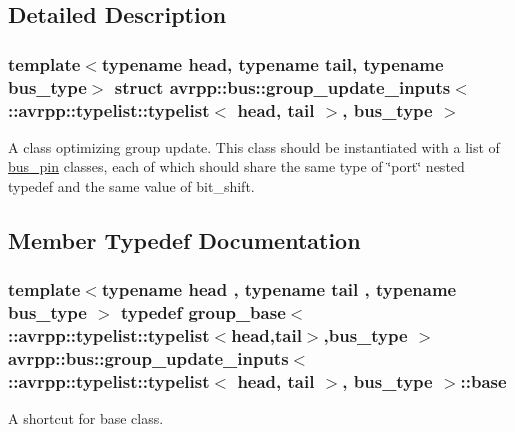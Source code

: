 \subsection{Detailed Description}
\subsubsection*{template$<$typename head, typename tail, typename bus\_\-type$>$ struct avrpp::bus::group\_\-update\_\-inputs$<$ ::avrpp::typelist::typelist$<$ head, tail $>$, bus\_\-type $>$}

A class optimizing group update. This class should be instantiated with a list of \hyperlink{structavrpp_1_1bus_1_1bus__pin}{bus\_\-pin} classes, each of which should share the same type of \char`\"{}port\char`\"{} nested typedef and the same value of bit\_\-shift. 

\subsection{Member Typedef Documentation}
\hypertarget{structavrpp_1_1bus_1_1group__update__inputs_3_01_1_1avrpp_1_1typelist_1_1typelist_3_01head_00_01tail_01_4_00_01bus__type_01_4_a08a17b67306a7ba9bc0cf28c02ad0cfa}{
\subsubsection[{base}]{\setlength{\rightskip}{0pt plus 5cm}template$<$typename head , typename tail , typename bus\_\-type $>$ typedef group\_\-base$<$ ::{\bf avrpp::typelist::typelist}$<$head,tail$>$,bus\_\-type $>$ avrpp::bus::group\_\-update\_\-inputs$<$ ::{\bf avrpp::typelist::typelist}$<$ head, tail $>$, bus\_\-type $>$::{\bf base}}}
\label{structavrpp_1_1bus_1_1group__update__inputs_3_01_1_1avrpp_1_1typelist_1_1typelist_3_01head_00_01tail_01_4_00_01bus__type_01_4_a08a17b67306a7ba9bc0cf28c02ad0cfa}


A shortcut for base class. 

